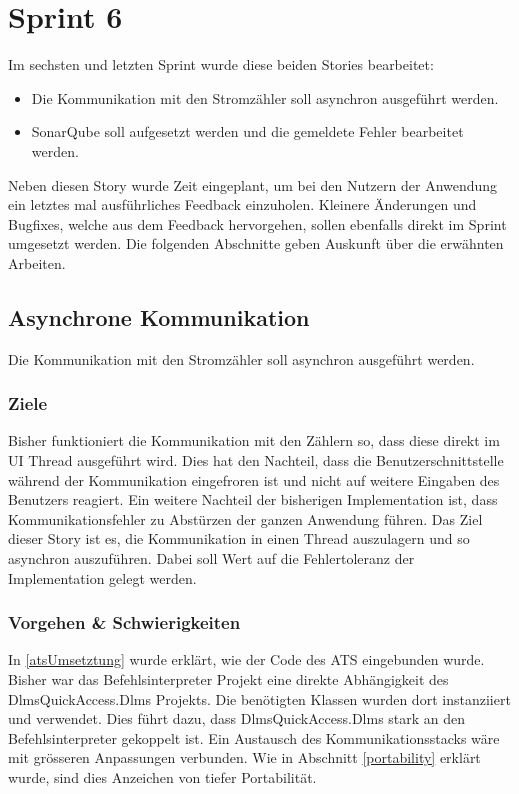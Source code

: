 \section{Sprint 6}\label{s6}
Im sechsten und letzten Sprint wurde diese beiden Stories bearbeitet:
\begin{itemize}
   \item Die Kommunikation mit den Stromzähler soll asynchron ausgeführt werden.
   \item SonarQube soll aufgesetzt werden und die gemeldete Fehler bearbeitet werden.
\end{itemize}
Neben diesen Story wurde Zeit eingeplant, um bei den Nutzern der Anwendung ein letztes mal ausführliches Feedback einzuholen.
Kleinere Änderungen und Bugfixes, welche aus dem Feedback hervorgehen, sollen ebenfalls direkt im Sprint umgesetzt werden.
Die folgenden Abschnitte geben Auskunft über die erwähnten Arbeiten.

\subsection{Asynchrone Kommunikation}
\dq Die Kommunikation mit den Stromzähler soll asynchron ausgeführt werden.\dq
\subsubsection{Ziele}
Bisher funktioniert die Kommunikation mit den Zählern so, dass diese direkt im UI Thread ausgeführt wird.
Dies hat den Nachteil, dass die Benutzerschnittstelle während der Kommunikation eingefroren ist und nicht auf weitere Eingaben des Benutzers reagiert.
Ein weitere Nachteil der bisherigen Implementation ist, dass Kommunikationsfehler zu Abstürzen der ganzen Anwendung führen.
Das Ziel dieser Story ist es, die Kommunikation in einen Thread auszulagern und so asynchron auszuführen.
Dabei soll Wert auf die Fehlertoleranz der Implementation gelegt werden.


\subsubsection{Vorgehen \& Schwierigkeiten}
In \ref{atsUmsetztung} wurde erklärt, wie der Code des \ac{ATS} eingebunden wurde.
Bisher war das Befehlsinterpreter Projekt eine direkte Abhängigkeit des DlmsQuickAccess.Dlms Projekts.
Die benötigten Klassen wurden dort instanziiert und verwendet. 
Dies führt dazu, dass DlmsQuickAccess.Dlms stark an den Befehlsinterpreter gekoppelt ist.
Ein Austausch des Kommunikationsstacks wäre mit grösseren Anpassungen verbunden.
Wie in Abschnitt \ref{portability} erklärt wurde, sind dies Anzeichen von tiefer Portabilität.

